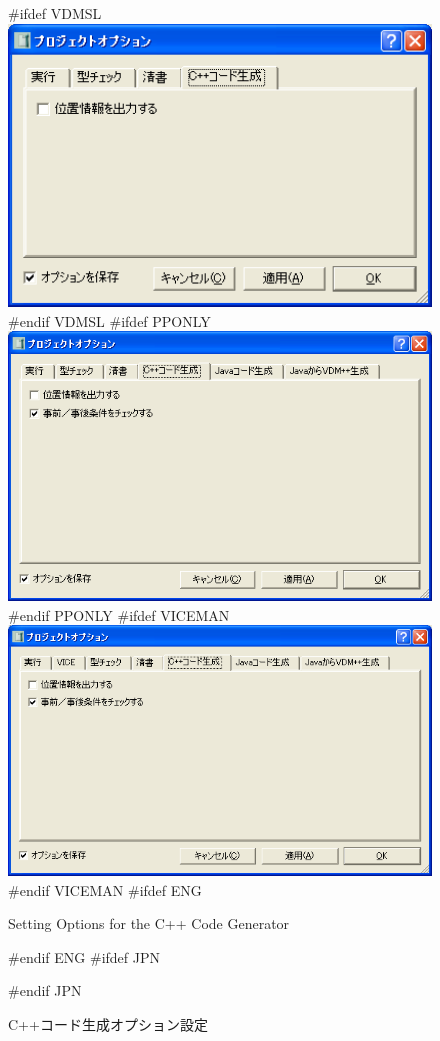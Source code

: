 \documentclass[\pformat,12pt]{article}
\begin{document}
\begin{figure}[tbh]
\begin{center}
#ifdef VDMSL
\includegraphics[width=12cm]{ccgOptions-sl.png}
#endif VDMSL
#ifdef PPONLY
\includegraphics[width=12cm]{ccgOptions-pp.png}
#endif PPONLY
#ifdef VICEMAN
\includegraphics[width=12cm]{ccgOptions-vice.png}
#endif VICEMAN
#ifdef ENG
\caption{Setting Options for the C++ Code Generator}
#endif ENG
#ifdef JPN
\caption{C++コード生成オプション設定}
#endif JPN
\label{fig:optccg}
\end{center}
\end{figure}
\end{document}

